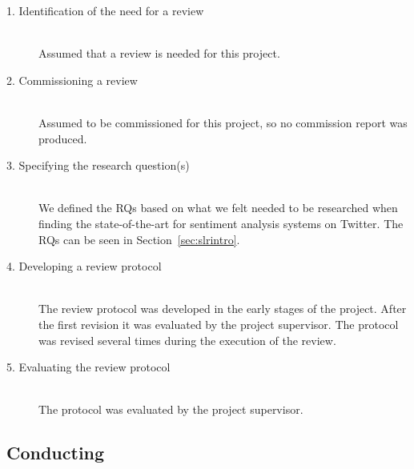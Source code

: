 \begin{description}

	\item[1. Identification of the need for a review] \hfill \\
		Assumed that a review is needed for this project. 
		
	\item[2. Commissioning a review] \hfill \\
		Assumed to be commissioned for this project, so no commission report was produced. 

	\item[3. Specifying the research question(s)] \hfill \\
		We defined the RQs based on what we felt needed to be researched when finding the state-of-the-art for sentiment analysis systems on Twitter. The RQs can be seen in Section~\ref{sec:slrintro}. 

	\item[4. Developing a review protocol] \hfill \\
		The review protocol was developed in the early stages of the project. After the first revision it was evaluated by the project supervisor. The protocol was revised several times during the execution of the review.
	

	\item[5. Evaluating the review protocol] \hfill \\
		The protocol was evaluated by the project supervisor. 

\end{description}


\subsection{Conducting}

